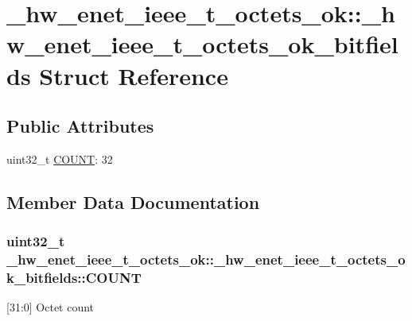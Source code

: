 \hypertarget{struct__hw__enet__ieee__t__octets__ok_1_1__hw__enet__ieee__t__octets__ok__bitfields}{}\section{\+\_\+hw\+\_\+enet\+\_\+ieee\+\_\+t\+\_\+octets\+\_\+ok\+:\+:\+\_\+hw\+\_\+enet\+\_\+ieee\+\_\+t\+\_\+octets\+\_\+ok\+\_\+bitfields Struct Reference}
\label{struct__hw__enet__ieee__t__octets__ok_1_1__hw__enet__ieee__t__octets__ok__bitfields}
\subsection*{Public Attributes}
\begin{DoxyCompactItemize}
\item 
uint32\+\_\+t \hyperlink{struct__hw__enet__ieee__t__octets__ok_1_1__hw__enet__ieee__t__octets__ok__bitfields_ad4189c62670f59e01715b05aaed61012}{C\+O\+U\+NT}\+: 32
\end{DoxyCompactItemize}


\subsection{Member Data Documentation}
\subsubsection[{\texorpdfstring{C\+O\+U\+NT}{COUNT}}]{\setlength{\rightskip}{0pt plus 5cm}uint32\+\_\+t \+\_\+hw\+\_\+enet\+\_\+ieee\+\_\+t\+\_\+octets\+\_\+ok\+::\+\_\+hw\+\_\+enet\+\_\+ieee\+\_\+t\+\_\+octets\+\_\+ok\+\_\+bitfields\+::\+C\+O\+U\+NT}\hypertarget{struct__hw__enet__ieee__t__octets__ok_1_1__hw__enet__ieee__t__octets__ok__bitfields_ad4189c62670f59e01715b05aaed61012}{}\label{struct__hw__enet__ieee__t__octets__ok_1_1__hw__enet__ieee__t__octets__ok__bitfields_ad4189c62670f59e01715b05aaed61012}
\mbox{[}31\+:0\mbox{]} Octet count 

